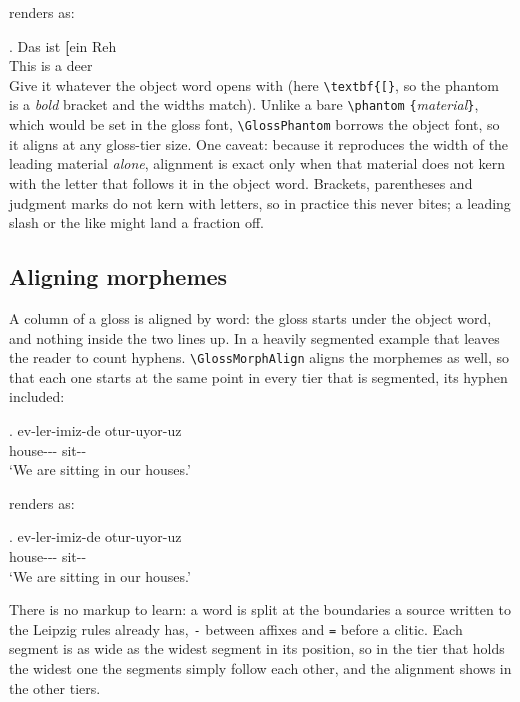 \documentclass[11pt,a4paper]{article}
\newcommand{\cs}[1]{\texttt{\textbackslash #1}}
\newcommand{\meta}[1]{\textrm{\itshape\textlangle#1\textrangle}}
\newcommand{\marg}[1]{\penalty300 \texttt{\{}\meta{#1}\texttt{\}}}
\newcommand{\rendered}{\par\medskip\noindent\textcolor{gray!70}{\small renders as:}\par\nobreak\smallskip}
\newcommand{\afterex}{\par\addvspace{\medskipamount}}
\begin{document}
\rendered
\ex. \gll Das ist \textbf{[}ein Reh\\ This is \GlossPhantom{\textbf{[}}a deer\\

\noindent Give it whatever the object word opens with (here
\cs{textbf}\texttt{\{[\}}, so the phantom is a \emph{bold} bracket and the
widths match). Unlike a bare \cs{phantom}\marg{material}, which would be set
in the gloss font, \cs{GlossPhantom} borrows the object font, so it aligns at
any gloss-tier size. One caveat: because it reproduces the width of the
leading material \emph{alone}, alignment is exact only when that material does
not kern with the letter that follows it in the object word. Brackets,
parentheses and judgment marks do not kern with letters, so in practice this
never bites; a leading slash or the like might land a fraction off.

\subsection{Aligning morphemes}\label{sec:morphalign}

A column of a gloss is aligned by word: the gloss starts under the object
word, and nothing inside the two lines up. In a heavily segmented example
that leaves the reader to count hyphens. \cs{GlossMorphAlign} aligns the
morphemes as well, so that each one starts at the same point in every tier
that is segmented, its hyphen included:

\begin{code}
\GlossMorphAlign
\ex. \gll ev-ler-imiz-de otur-uyor-uz \\
          house---
          sit-- \\
\glt `We are sitting in our houses.'
\end{code}

\rendered
{\GlossMorphAlign
\ex. \gll ev-ler-imiz-de otur-uyor-uz \\
     house--- sit-- \\
\glt `We are sitting in our houses.'

}

\afterex
There is no markup to learn: a word is split at the boundaries a source
written to the Leipzig rules already has, \texttt{-} between affixes and
\texttt{=} before a clitic. Each segment is as wide as the widest segment
in its position, so in the tier that holds the widest one the segments
simply follow each other, and the alignment shows in the other tiers.
\end{document}

